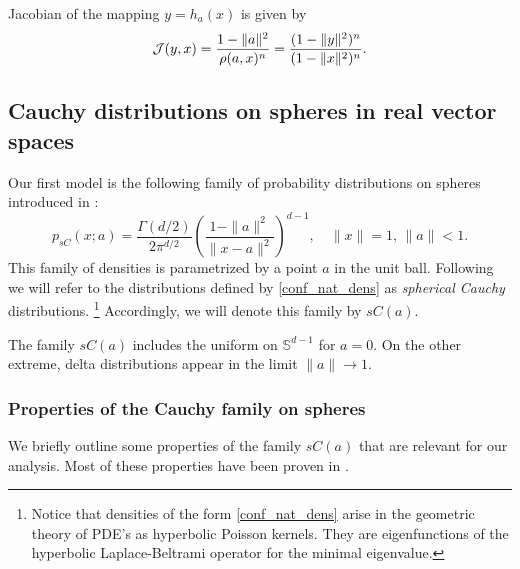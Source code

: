 \documentclass{article}
\theoremstyle{plain}%
\theoremstyle{definition}
\theoremstyle{remark}
\theoremstyle{prop}
\begin{document}



Jacobian of the mapping $y=h_a(x)$ is given by  
\begin{equation}
\label{jaco}
{\cal J}(y,x)=\frac{1- \| a \|^2}{\rho(a,x)^n}=\frac{(1- \| y \|^2)^n}{(1- \| x \|^2)^n}.
\end{equation}



\subsection{Cauchy distributions on spheres in real vector spaces}

Our first model is the following family of probability distributions on spheres introduced in \cite{KMcC}:
\begin{equation}
\label{conf_nat_dens}
p_{sC}(x;a) = \frac{\Gamma(d/2)}{2 \pi^{d/2}} \left( \frac{1 - \| a \|^2}{\| x-a \|^2} \right)^{d-1}, \quad \| x \| = 1, \, \| a \|<1.
\end{equation}
This family of densities is parametrized by a point $a$ in the unit ball. Following \cite{KMcC} we will refer to the distributions defined by \eqref{conf_nat_dens} as {\it spherical Cauchy} distributions. \footnote{Notice that densities of the form \eqref{conf_nat_dens} arise in the geometric theory of PDE's as hyperbolic Poisson kernels. They are eigenfunctions of the hyperbolic Laplace-Beltrami operator for the minimal eigenvalue.} Accordingly, we will denote this family by $sC(a)$.

The family $sC(a)$ includes the uniform on ${\mathbb S}^{d-1}$ for $a=0$. On the other extreme, delta distributions appear in the limit $\|a\| \to 1$.

\subsubsection{Properties of the Cauchy family on spheres}

We briefly outline some properties of the family $sC(a)$ that are relevant for our analysis. Most of these properties have been proven in \cite{JK}. 
\end{document}
